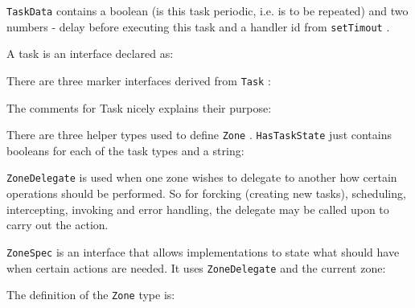 

\texttt{TaskData}
contains a boolean (is this task periodic, i.e. is to be repeated) and two
numbers - delay before executing this task and a handler id from
\texttt{setTimout}
.



A task is an interface declared as:



There are three marker interfaces derived from
\texttt{Task}
:



The comments for Task nicely explains their purpose:



There are three helper types used to define
\texttt{Zone}
.
\texttt{HasTaskState}
just contains
booleans for each of the task types and a string:



\texttt{ZoneDelegate}
is used when one zone wishes to delegate to another how certain
operations should be performed. So for forcking (creating new tasks), scheduling,
intercepting, invoking and error handling, the delegate may be called upon to carry
out the action.



\texttt{ZoneSpec}
is an interface that allows implementations to state what should have when
certain actions are needed. It uses
\texttt{ZoneDelegate}
and the current zone:



The definition of the
\texttt{Zone}
type is:




